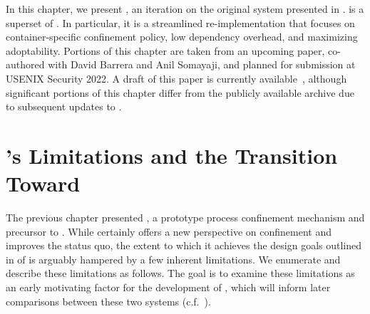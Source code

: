 In this chapter, we present \bpfcontain{}, an iteration on the original \bpfbox{} system
presented in . \bpfcontain{} is a superset of \bpfbox. In particular, it is
a streamlined re-implementation that focuses on container-specific confinement policy, low
dependency overhead, and maximizing adoptability. Portions of this chapter are taken from
an upcoming paper, co-authored with David Barrera and Anil Somayaji, and planned for
submission at USENIX Security 2022. A draft of this paper is currently
available~\cite{findlay2021_bpfcontain}, although significant portions of this chapter
differ from the publicly available archive due to subsequent updates to \bpfcontain{}.



\section{\bpfbox{}'s Limitations and the Transition Toward \bpfcontain{}}%
\label{s:bpfcontain-bpfbox-limitations}

The previous chapter presented \bpfbox{}, a prototype process confinement mechanism and
precursor to \bpfcontain{}. While \bpfbox{} certainly offers a new perspective on
confinement and improves the status quo, the extent to which it achieves the design goals
outlined in  of  is arguably hampered by
a few inherent limitations. We enumerate and describe these limitations as follows.  The
goal is to examine these limitations as an early motivating factor for the development of
\bpfcontain{}, which will inform later comparisons between these two systems
(c.f.~).


